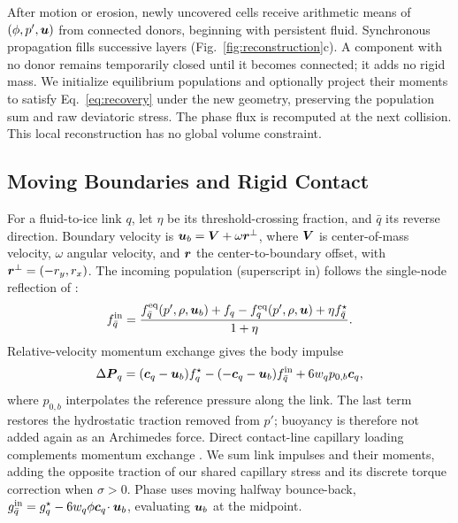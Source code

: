 After motion or erosion, newly uncovered cells receive arithmetic means
of $(\phi,p',\boldsymbol{u})$ from connected donors, beginning with persistent
fluid. Synchronous propagation fills successive layers
(Fig.~\ref{fig:reconstruction}c). A component with
no donor remains temporarily closed until it becomes connected; it adds
no rigid mass. We initialize equilibrium populations and optionally
project their moments to satisfy Eq.~\eqref{eq:recovery} under the new
geometry, preserving the population sum and raw deviatoric stress.
The phase flux is recomputed at the next collision. This local reconstruction
has no global volume constraint.

\subsection{Moving Boundaries and Rigid Contact}
\label{sec:rigid}
For a fluid-to-ice link $q$, let $\eta$ be its threshold-crossing fraction, and $\bar q$ its reverse direction.
Boundary velocity is $\boldsymbol{u}_b=\boldsymbol{V}+\omega\boldsymbol{r}^\perp$, where
$\boldsymbol{V}$ is center-of-mass velocity, $\omega$ angular velocity, and
$\boldsymbol{r}$ the center-to-boundary offset, with
$\boldsymbol{r}^\perp=(-r_y,r_x)$. The incoming population (superscript
$\mathrm{in}$) follows the single-node reflection of \citet{Tao2018}:
\begin{equation}
      f_{\bar q}^{\mathrm{in}}=
      \frac{f_{\bar q}^{\mathrm{eq}}(p',\rho,\boldsymbol{u}_b)
            +f_q-f_q^{\mathrm{eq}}(p',\rho,\boldsymbol{u})
            +\eta f_{\bar q}^{\star}}{1+\eta}.
      \label{eq:boundary}
\end{equation}
Relative-velocity momentum exchange \citep{Wen2014} gives the body impulse
\begin{equation}
      \Delta\boldsymbol{P}_q=(\boldsymbol{c}_q-\boldsymbol{u}_b)f_q^\star
      -(-\boldsymbol{c}_q-\boldsymbol{u}_b)f_{\bar q}^{\mathrm{in}}
      +6w_qp_{0,b}\boldsymbol{c}_q,
      \label{eq:impulse}
\end{equation}
where $p_{0,b}$ interpolates the reference pressure along the link.
The last term restores the hydrostatic traction removed from $p'$;
buoyancy is therefore not added again as an Archimedes force.
Direct contact-line capillary loading complements momentum exchange
\citep{Zhang2020}. We sum link impulses and their moments, adding the
opposite traction of our shared capillary stress and its discrete torque
correction when $\sigma>0$.
Phase uses moving halfway bounce-back,
$g_{\bar q}^{\mathrm{in}}=g_q^\star-
      6w_q\phi\boldsymbol{c}_q\!\cdot\boldsymbol{u}_b$, evaluating $\boldsymbol{u}_b$ at the midpoint.

